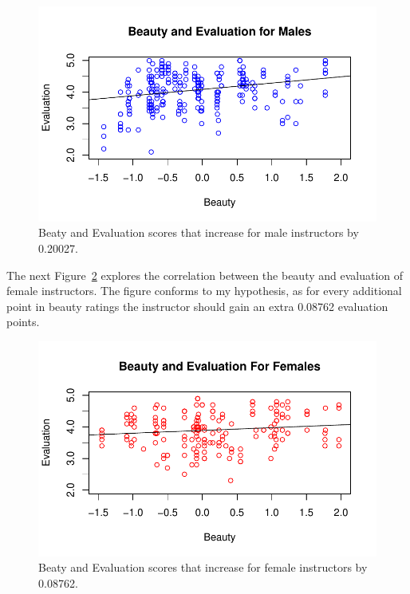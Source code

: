 \documentclass[
  letterpaper,
  DIV=11,
  numbers=noendperiod]{scrartcl}
\begin{document}
\begin{figure}

{\centering \includegraphics{paper_files/figure-pdf/fig-males-beauty-eval-1.pdf}

}

\caption{\label{fig-males-beauty-eval}Beaty and Evaluation scores that
increase for male instructors by 0.20027.}

\end{figure}

The next Figure~\ref{fig-females-beauty-eval} explores the correlation
between the beauty and evaluation of female instructors. The figure
conforms to my hypothesis, as for every additional point in beauty
ratings the instructor should gain an extra 0.08762 evaluation points.

\begin{figure}

{\centering \includegraphics{paper_files/figure-pdf/fig-females-beauty-eval-1.pdf}

}

\caption{\label{fig-females-beauty-eval}Beaty and Evaluation scores that
increase for female instructors by 0.08762.}

\end{figure}
\end{document}
